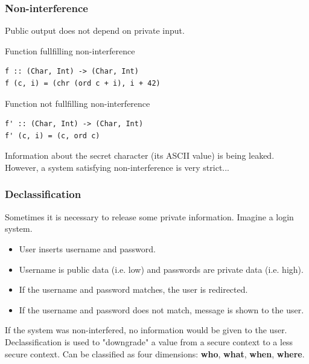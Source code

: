 \documentclass{beamer}
\begin{document}

\begin{frame}[fragile]
  \frametitle{Non-interference}
  Public output does not depend on private input. \pause

  \begin{block}{Function fullfilling non-interference}
\begin{verbatim}
f :: (Char, Int) -> (Char, Int)
f (c, i) = (chr (ord c + i), i + 42)
\end{verbatim}
  \end{block}
  \pause
  \begin{block}{Function not fullfilling non-interference}
\begin{verbatim}
f' :: (Char, Int) -> (Char, Int)
f' (c, i) = (c, ord c)
\end{verbatim}
  \end{block}
  \pause
  Information about the secret character (its ASCII value) is being leaked.
  \pause
  \newline
  However, a system satisfying non-interference is very strict...
\end{frame}


\begin{frame}
  \frametitle{Declassification}
  Sometimes it is necessary to release some private information.\pause
  \newline
  Imagine a login system. \pause
  \begin{itemize}
    \item User inserts username and password.
    \item Username is public data (i.e. low) and passwords are private data (i.e. high).
    \item If the username and password matches, the user is redirected.
    \item If the username and password does not match, message is shown to the user.
  \end{itemize}
  \pause
  If the system was non-interfered, no information would be given to the user.\pause
  \newline
  Declassification is used to "downgrade" a value from a secure context to a less secure context. \pause
  \newline
  Can be classified as four dimensions: \textbf{who}, \textbf{what}, \textbf{when}, \textbf{where}.
\end{frame}
\end{document}
